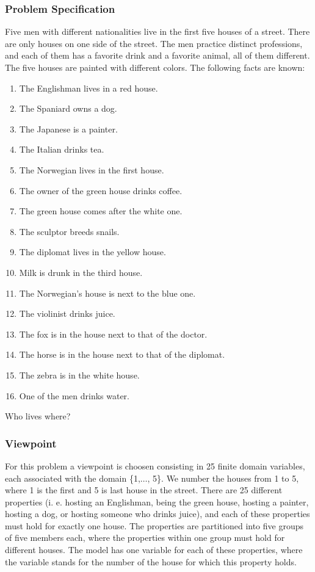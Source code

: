 \documentclass[a4paper]{scrartcl}
\begin{document}
\subsubsection{Problem Specification}
Five men with different nationalities live in the first five 
houses of a street. There are only houses on one side of the street. 
The men practice distinct professions, and each of them has a favorite 
drink and a favorite animal, all of them different. The five houses are 
painted with different colors. The following facts are known: 
\begin{enumerate}
\item
The Englishman lives in a red house.
\item
The Spaniard owns a dog.
\item
The Japanese is a painter.
\item
The Italian drinks tea.
\item
The Norwegian lives in the first house.
\item
The owner of the green house drinks coffee.
\item
The green house comes after the white one.
\item
The sculptor breeds snails.
\item
The diplomat lives in the yellow house.
\item
Milk is drunk in the third house.
\item
The Norwegian's house is next to the blue one.
\item
The violinist drinks juice.
\item
The fox is in the house next to that of the doctor.
\item
The horse is in the house next to that of the diplomat.
\item
The zebra is in the white house.
\item
One of the men drinks water.
\end{enumerate}
Who lives where? 


\subsubsection{Viewpoint}
For this problem a viewpoint is choosen consisting in 25
finite domain variables, each associated with the domain \{1,$\ldots$, 5\}.
We number the houses from 1 to 5, where 1 is the first and 5 
is last house in the street. There are 25 different properties 
(i. e. hosting an Englishman, being the green house, hosting a painter, 
hosting a dog, or hosting someone who drinks juice), and each 
of these properties must hold for exactly one house. The properties 
are partitioned into five groups of five members each, where the 
properties within one group must hold for different houses. The model 
has one variable for each of these properties, where the variable 
stands for the number of the house for which this property holds. 
\end{document}
